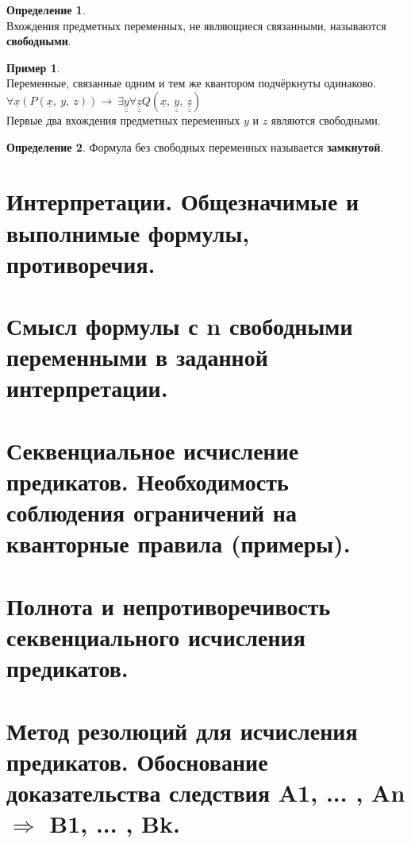 \documentclass[a4paper,12pt]{article}
\theoremstyle{definition} %
\newtheorem{definition}{Определение}[section]
\newtheorem{example}{Пример}[section]
\theoremstyle{definition} %
\theoremstyle{remark} %
\begin{document}
	\begin{definition} \ \\[1ex]
		Вхождения предметных переменных, не являющиеся связанными, называются \textbf{свободными}.
	\end{definition}

	\begin{example} \ \\[1ex]
		Переменные, связанные одним и тем же квантором подчёркнуты одинаково.
		$\forall \underline{x} (P(\underline{x}, \ y, \ z)) \rightarrow \ \exists \underline{\underline{y}} \forall \underline{\underline{\underline{z}}} Q(\underline{x}, \ \underline{\underline{y}}, \ \underline{\underline{\underline{z}}})$\\[1ex]
		Первые два вхождения предметных переменных $y$ и $z$ являются свободными.
	\end{example}

	\begin{definition}
		Формула без свободных переменных называется \textbf{замкнутой}.
	\end{definition}

\section{Интерпретации. Общезначимые и выполнимые формулы, противоречия.}

\section{Смысл формулы с n свободными переменными в заданной интерпретации.}

\section{Секвенциальное исчисление предикатов. Необходимость соблюдения ограничений на кванторные правила (примеры).}

\section{Полнота и непротиворечивость секвенциального исчисления предикатов.}

\section{Метод резолюций для исчисления предикатов. Обоснование доказательства следствия A1, ... ,	An $\Rightarrow$ B1, ... , Bk.}
\end{document}
